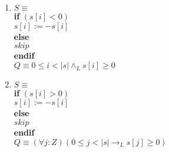 \documentclass{article}
\begin{document}
\begin{enumerate}[label=\alph*)]
\item $S \equiv$\\
   \textbf{if} $( s [ i ] < 0 )$\\
   \hspace*{6mm}$ s [ i ] := -s [ i ]$\\
   \textbf{else}\\
   \hspace*{6mm}$skip$\\
   \textbf{endif}\\

   $Q \equiv 0 \leq i < |s| \wedge_L s[i] \geq 0$\\
\item $S \equiv$\\
   \textbf{if} $( s [ i ] > 0 )$\\
   \hspace*{6mm}$s [ i ] := -s [ i ]$\\
   \textbf{else}\\
   \hspace*{6mm}$skip$\\
   \textbf{endif}\\

   $Q \equiv (\forall j :Z)(0 \leq j < |s| \rightarrow_L s[j] \geq 0)$
\end{enumerate}
\end{document}
